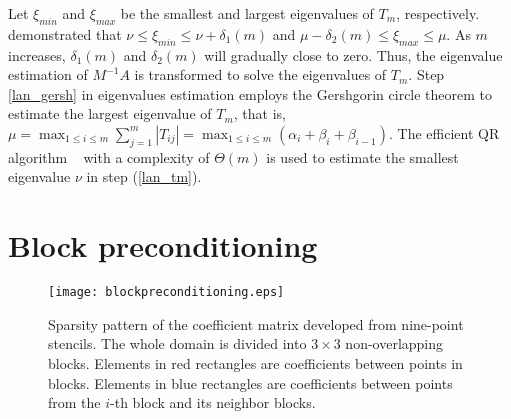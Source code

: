 Let $\xi_{min}$ and $\xi_{max}$ be the smallest and largest eigenvalues of $T_m$, respectively. \citet{Paige1980235} demonstrated that
$\nu \le \xi_{min} \le \nu+\delta_1(m)$ and $\mu -\delta_2(m)  \le \xi_{max} \le \mu$.
As $m$ increases, $\delta_1(m)$ and $\delta_2(m)$ will gradually close to zero. Thus, the eigenvalue estimation of $M^{-1}A$ is transformed to solve the eigenvalues of $T_m$.
Step \ref{lan_gersh} in eigenvalues estimation employs the Gershgorin circle theorem to estimate the largest eigenvalue of $T_m$, that is,
$\mu = \max_{1 \le i \le m}\sum^m_{j=1}|T_{ij}|=\max_{1 \le i \le m}(\alpha_i +\beta_{i}+\beta_{i-1})$.
The efficient QR algorithm ~\citep{ortega1963llt} with a complexity of $\Theta(m)$ is used to estimate the smallest eigenvalue $\nu$ in step (\ref{lan_tm}).

\section{Block preconditioning}
\begin {figure}[!htbp]
\centering
\texttt{[image: blockpreconditioning.eps]}
\caption[] {Sparsity pattern of the coefficient matrix developed from nine-point stencils.
The whole domain is divided into $3\times3$ non-overlapping blocks.
Elements in red rectangles are coefficients between points in blocks.
Elements in blue rectangles are coefficients between points from the $i$-th block and its neighbor blocks. \label{fig:blockprecond}}
\end{figure}

